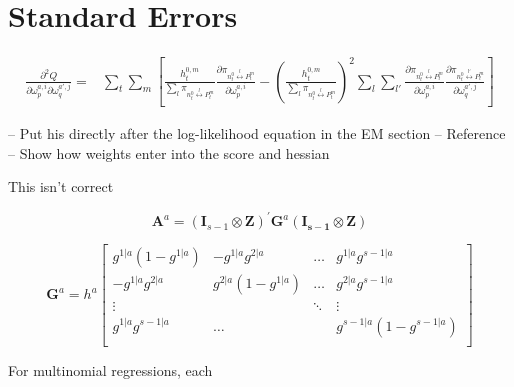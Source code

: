 \documentclass[12pt]{article}
\begin{document}
\section{Standard Errors}

\begin{equation} \label{eq:gateHessian}
  \begin{split}
    \frac{\partial^{2} Q}{\partial \omega^{a,i}_{p} \partial \omega^{a',j}_{q}} =& \sum_{t} \sum_{m} \left[  \frac{h^{0,m}_{t}}{\sum_{l} \pi_{n^{0}_{t} \overset{l}{\longleftrightarrow} P^{m}_{t}}} \frac{\partial \pi_{n^{0}_{t} \overset{l}{\longleftrightarrow} P^{m}_{t}}}{\partial \omega^{a,i}_{p}} - \left( \frac{h^{0,m}_{t}}{\sum_{l} \pi_{n^{0}_{t} \overset{l}{\longleftrightarrow} P^{m}_{t}}} \right)^{2} \sum_{l} \sum_{l'} \frac{\partial \pi_{n^{0}_{t} \overset{l}{\longleftrightarrow} P^{m}_{t}}}{\partial \omega^{a,i}_{p}}  \frac{\partial \pi_{n^{0}_{t} \overset{l'}{\longleftrightarrow} P^{m}_{t}}}{\partial \omega^{a',j}_{q}} \right]
  \end{split}
\end{equation}

-- Put his directly after the log-likelihood equation in the EM section
-- Reference \cite{MengRubinSEM1991}
-- Show how weights enter into the score and hessian

\bigskip

This isn't correct

\begin{equation} \label{eq:gatinghessianQ}
  \mathbf{A}^{a} = (\mathbf{I}_{s-1} \otimes \mathbf{Z})^{\prime} \mathbf{G}^{a} (\mathbf{I_{s-1}} \otimes \mathbf{Z})
\end{equation}

\begin{equation} \label{eq:nodehessian}
  \mathbf{G}^{a} = h^{a} \begin{bmatrix}
     g^{1|a}(1-g^{1|a}) & -g^{1|a}g^{2|a}    & \dots  & g^{1|a}g^{s-1|a}       \\
     -g^{1|a}g^{2|a}    & g^{2|a}(1-g^{1|a}) & \dots  & g^{2|a}g^{s-1|a}       \\
     \vdots             &                    & \ddots & \vdots                 \\
     g^{1|a}g^{s-1|a}   &  \dots             &        & g^{s-1|a}(1-g^{s-1|a}) \\
  \end{bmatrix}
\end{equation}

For multinomial regressions, each 
\end{document}
